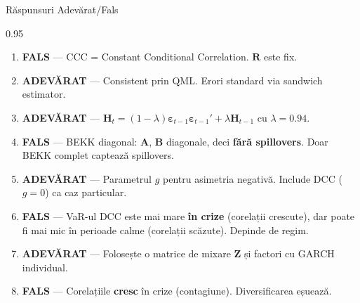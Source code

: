 \documentclass[9pt, aspectratio=169, t]{beamer}
\begin{document}
\begin{frame}{Răspunsuri Adevărat/Fals}
    \begin{cminipage}{0.95\textwidth}
    \begin{enumerate}\setlength{\itemsep}{0pt}
        \item \textbf{FALS} --- CCC = Constant Conditional Correlation. $\mathbf{R}$ este fix.

        \vspace{0.2cm}

        \item \textbf{ADEVĂRAT} --- Consistent prin QML. Erori standard via sandwich estimator.

        \vspace{0.2cm}

        \item \textbf{ADEVĂRAT} --- $\mathbf{H}_t = (1-\lambda)\boldsymbol{\varepsilon}_{t-1}\boldsymbol{\varepsilon}_{t-1}' + \lambda\mathbf{H}_{t-1}$ cu $\lambda = 0.94$.

        \vspace{0.2cm}

        \item \textbf{FALS} --- BEKK diagonal: $\mathbf{A}$, $\mathbf{B}$ diagonale, deci \textbf{fără spillovers}. Doar BEKK complet captează spillovers.

        \vspace{0.2cm}

        \item \textbf{ADEVĂRAT} --- Parametrul $g$ pentru asimetria negativă. Include DCC ($g=0$) ca caz particular.

        \vspace{0.2cm}

        \item \textbf{FALS} --- VaR-ul DCC este mai mare \textbf{în crize} (corelații crescute), dar poate fi mai mic în perioade calme (corelații scăzute). Depinde de regim.

        \vspace{0.2cm}

        \item \textbf{ADEVĂRAT} --- Folosește o matrice de mixare $\mathbf{Z}$ și factori cu GARCH individual.

        \vspace{0.2cm}

        \item \textbf{FALS} --- Corelațiile \textbf{cresc} în crize (contagiune). Diversificarea eșuează.
    \end{enumerate}
    \end{cminipage}
\end{frame}
\end{document}

